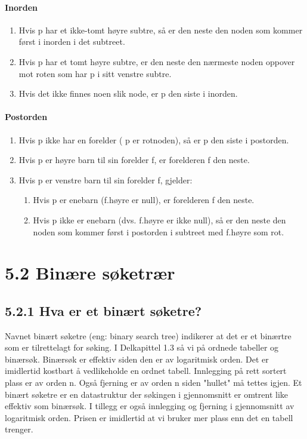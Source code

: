 \documentclass[11pt]{article}
\begin{document}
            \paragraph{Inorden}
            \begin{enumerate}
                \item Hvis p har et ikke-tomt høyre subtre, så er den neste den noden som kommer først i
                    inorden i det subtreet.
                \item Hvis p har et tomt høyre subtre, er den neste den nærmeste noden oppover mot roten
                    som har p i sitt venstre subtre.
                \item Hvis det ikke finnes noen slik node, er p den siste i inorden.
            \end{enumerate}

            \paragraph{Postorden}
            \begin{enumerate}
                \item Hvis p ikke har en forelder ( p er rotnoden), så er p den siste i postorden.
                \item Hvis p er høyre barn til sin forelder f, er forelderen f den neste.
                \item Hvis p er venstre barn til sin forelder f, gjelder:
                    \begin{enumerate}
                        \item Hvis p er enebarn (f.høyre er null), er forelderen f den neste.
                        \item Hvis p ikke er enebarn (dvs. f.høyre er ikke null), så er den neste den noden
                                som kommer først i postorden i subtreet med f.høyre som rot.
                    \end{enumerate}
            \end{enumerate}

\newpage
\section{5.2 Binære søketrær}
    \subsection{5.2.1 Hva er et binært søketre?}
        Navnet binært søketre (eng: binary search tree) indikerer at det er et binærtre som er
        tilrettelagt for søking. I Delkapittel 1.3 så vi på ordnede tabeller og binærsøk. Binærsøk er
        effektiv siden den er av logaritmisk orden. Det er imidlertid kostbart å vedlikeholde en ordnet
        tabell. Innlegging på rett sortert plass er av orden n. Også fjerning er av orden n siden
        "hullet" må tettes igjen. Et binært søketre er en datastruktur der søkingen i gjennomsnitt er
        omtrent like effektiv som binærsøk. I tillegg er også innlegging og fjerning i gjennomsnitt av
        logaritmisk orden. Prisen er imidlertid at vi bruker mer plass enn det en tabell trenger.
\end{document}
